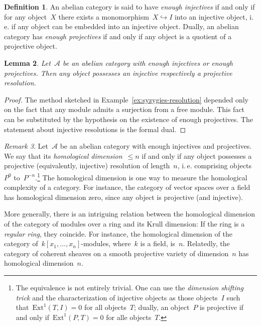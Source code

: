 \documentclass{amsart}
\makeatletter
\theoremstyle{definition}
\newtheorem{defn}{Definition}[section]
\theoremstyle{plain}
\newtheorem{lemma}[defn]{Lemma}
\theoremstyle{remark}
\newtheorem{rem}[defn]{Remark}
\newcommand{\A}{\mathcal{A}}
\newcommand{\Ext}{\mathrm{Ext}}
\newcommand{\?}{\,{:}\,}
\renewcommand{\_}{\mathpunct{.}\,}
\newcommand{\ie}{i.\,e.\@\xspace}
\makeatother
\begin{document}
\begin{defn}An abelian category is said to have \emph{enough injectives} if and
only if for any object~$X$ there exists a monomorphism~$X \hookrightarrow I$
into an injective object, \ie if any object can be embedded into an injective
object. Dually, an abelian category has \emph{enough
projectives} if and only if any object is a quotient of a projective
object.\end{defn}

\begin{lemma}Let~$\A$ be an abelian category with enough injectives or enough
projectives. Then any object possesses an injective respectively a projective
resolution.\end{lemma}
\begin{proof}The method sketched in Example~\ref{ex:syzygies-resolution}
depended only on the fact that any module admits a surjection from a free
module. This fact can be substituted by the hypothesis on the existence of
enough projectives. The statement about injective resolutions is the formal
dual.\end{proof}

\begin{rem}Let~$\A$ be an abelian category with enough injectives and
projectives. We say that its \emph{homological dimension}~$\leq n$ if and only
if any object possesses a projective (equivalently, injective) resolution of
length~$n$, \ie comprising objects~$P^0$ to~$P^{-n}$.\footnote{The equivalence
is not entirely trivial. One can use the \emph{dimension shifting trick}
and the characterization of injective objects as those objects~$I$ such
that~$\Ext^1(T,I) = 0$ for all objects~$T$; dually, an object~$P$ is projective
if and only if~$\Ext^1(P,T) = 0$ for alle objects~$T$.} The homological
dimension is one way to measure the homological complexity of a category. For
instance, the category of vector spaces over a field has homological dimension
zero, since any object is projective (and injective).

More generally, there is
an intriguing relation between the homological dimension of the category of
modules over a ring and its Krull dimension: If the ring is a \emph{regular
ring}, they coincide. For instance, the homological dimension of the category
of~$k[x_1,\ldots,x_n]$-modules, where~$k$ is a field, is~$n$. Relatedly, the
category of coherent sheaves on a smooth projective variety of
dimension~$n$ has homological dimension~$n$.
\end{rem}
\end{document}
